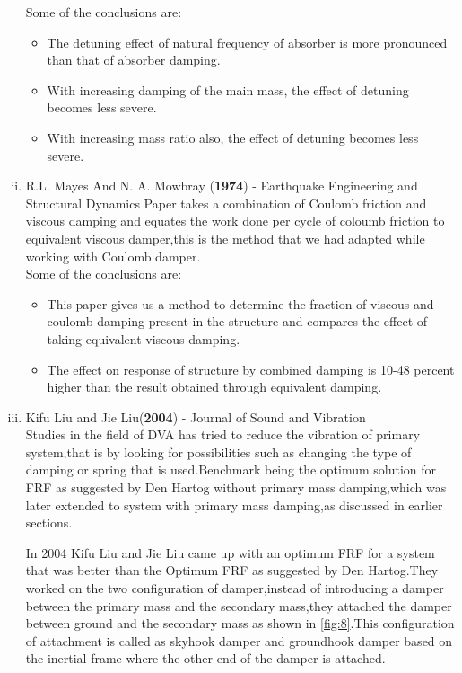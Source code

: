 \begin{enumerate}[i)]
Some of the conclusions are:

\begin{itemize}
\item The detuning effect of natural frequency of absorber is more pronounced than that of absorber damping.

 \item With increasing damping of the main mass, the effect of detuning becomes less severe.

\item  With increasing mass ratio also, the effect of detuning becomes less severe.

\end{itemize}

\item {R.L. Mayes And N. A. Mowbray (\textbf{1974}) - Earthquake Engineering and Structural Dynamics}
Paper takes a combination of Coulomb friction and viscous damping and equates the work done per cycle of coloumb friction  to equivalent viscous damper,this is the method that we had adapted while working with Coulomb damper.\\

Some of the conclusions are:
\begin{itemize}
\item This paper gives us a method to determine the fraction of viscous and coulomb damping present in the structure and compares the effect of taking equivalent viscous damping.

\item The effect on response of structure by combined damping is 10-48 percent higher than the result obtained through equivalent damping.
\end{itemize}

\item {Kifu Liu and Jie Liu(\textbf{2004}) - Journal of Sound and Vibration}\\
Studies in the field of DVA has tried to reduce the vibration of primary system,that is by  looking for possibilities such as changing the type of damping or spring that is used.Benchmark being the optimum solution for FRF as suggested by Den Hartog without primary mass damping,which was later extended to system with primary mass damping,as discussed in earlier sections.

In 2004 Kifu Liu and Jie Liu came up with an optimum FRF for a system that was better than the Optimum FRF as suggested by Den Hartog.They worked on the two configuration of damper,instead of introducing a damper between the primary mass and the secondary mass,they attached the damper between ground and the secondary mass as shown in \ref{fig:8}.This configuration of attachment is called as skyhook damper and groundhook damper based on the inertial frame where the other end of the damper is attached.


\end{enumerate}
